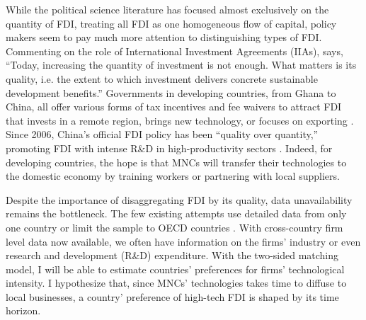 While the political science literature has focused almost exclusively on the quantity of FDI, treating all FDI as one homogeneous flow of capital, policy makers seem to pay much more attention to distinguishing types of FDI. Commenting on the role of International Investment Agreements (IIAs), \citet{UNCTAD2015} says, ``Today, increasing the quantity of investment is not enough. What matters is its quality, i.e. the extent to which investment delivers concrete sustainable development benefits.'' Governments in developing countries, from Ghana to China, all offer various forms of tax incentives and fee waivers to attract FDI that invests in a remote region, brings new technology, or focuses on exporting \citep{Ricupero2000}. Since 2006, China's official FDI policy has been ``quality over quantity,'' promoting FDI with intense R\&D in high-productivity sectors \citep{Guangzhou2011}. Indeed, for developing countries, the hope is that MNCs will transfer their technologies to the domestic economy by training workers or partnering with local suppliers.

Despite the importance of disaggregating FDI by its quality, data unavailability remains the bottleneck. The few existing attempts use detailed data from only one country or limit the sample to OECD countries \citep{Alfaro2003, Alfaro2007, Javorcik2004}. With cross-country firm level data now available, we often have information on the firms' industry or even research and development (R\&D) expenditure. With the two-sided matching model, I will be able to estimate countries' preferences for firms' technological intensity. I hypothesize that, since MNCs' technologies takes time to diffuse to local businesses, a country' preference of high-tech FDI is shaped by its time horizon.